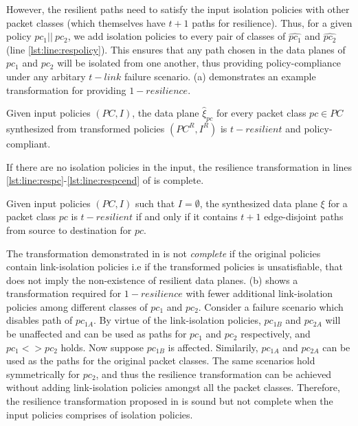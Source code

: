 However, the resilient paths need to satisfy the input isolation policies with other 
packet classes (which themselves have $t+1$ paths for resilience). Thus, for a 
given policy $pc_1 || ~pc_2$, we add isolation policies to every pair of 
classes of $\hat{pc_1}$ and $\hat{pc_2}$ (line \ref{lst:line:respolicy}). This ensures that any path 
chosen in the data planes of $pc_1$ and $pc_2$ will be isolated from one 
another, thus providing policy-compliance under any arbitary $t-link$ failure
scenario. (a) demonstrates an example transformation for providing $1-resilience$. 

\begin{theorem}[Soundness]
Given input policies $(PC, I)$, 
the data plane $\hat{\xi}_{pc}$ for every packet class $pc \in PC$
 synthesized from
transformed policies $(PC^R, I^R)$  is $t-resilient$ 
	and policy-compliant. 
\end{theorem}
\noindent If there are no isolation policies in the input, the resilience transformation in lines 
\ref{lst:line:respc}-\ref{lst:line:respcend} of  is complete.
\begin{theorem}[Completeness]
Given input policies $(PC,I)$ such that $I=\emptyset$,
the synthesized data plane $\xi$ for a packet class $pc$  
is $t-resilient$ if and only if it 
contains $t + 1$ edge-disjoint paths from source to destination
for $pc$.
\end{theorem}

\noindent The transformation demonstrated in  is not \emph{complete}
 if the original policies contain link-isolation policies i.e if the transformed policies
 is unsatisfiable, that does not imply the non-existence of resilient data planes. 
 (b) shows a  transformation required for $1-resilience$ 
 with fewer additional link-isolation policies among different classes
 of $pc_1$ and $pc_2$. Consider a failure scenario which disables path
 of $pc_{1A}$. By virtue of the link-isolation policies, $pc_{1B}$ and
 $pc_{2A}$ will be unaffected and can be used as paths for $pc_1$ 
 and $pc_2$ respectively, and $pc_1 <> pc_2$ holds. Now suppose
 $pc_{1B}$ is affected. Similarily, $pc_{1A}$ and $pc_{2A}$ can be used as
 the paths for the original packet classes. The same scenarios hold symmetrically
 for $pc_2$, and thus the resilience transformation can be achieved without
 adding link-isolation policies amongst all the packet classes. Therefore,
 the resilience transformation proposed in  is sound but not
 complete when the input policies comprises of isolation policies. 
 
